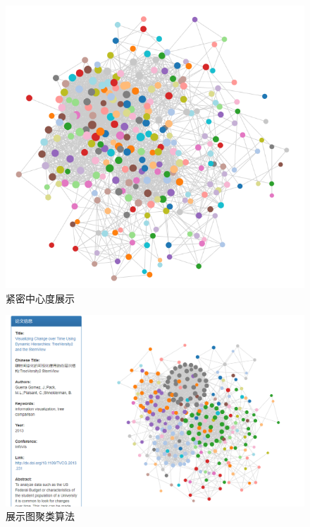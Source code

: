 \documentclass[UTF8, onecolumn, a4paper]{article}
\begin{document}
\begin{center}
\begin{figure}[ht]
\begin{minipage}[b]{0.93\linewidth}
\begin{minipage}[b]{0.46\linewidth}
				\includegraphics[width=\linewidth]{../pictures/show4}
				\caption{紧密中心度展示}
			\end{minipage}
		\end{minipage}
	\end{figure}
\end{center}
\begin{figure}[htb]
	\centering
	\includegraphics[width=0.8\linewidth]{../pictures/show5}
	\caption{展示图聚类算法}
\end{figure}
\clearpage

\ifx\allfiles\undefined
\end{document}
